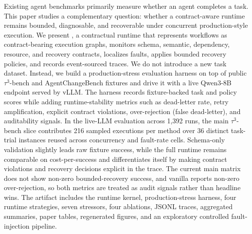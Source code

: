 Existing agent benchmarks primarily measure whether an agent completes a task. This paper studies a complementary question: whether a contract-aware runtime remains bounded, diagnosable, and recoverable under concurrent production-style execution. We present \system, a contractual runtime that represents workflows as contract-bearing execution graphs, monitors schema, semantic, dependency, resource, and recovery contracts, localizes faults, applies bounded recovery policies, and records event-sourced traces. We do not introduce a new task dataset. Instead, we build a production-stress evaluation harness on top of public \mbox{$\tau^3$}-bench and AgentChangeBench fixtures and drive it with a live Qwen3-8B endpoint served by vLLM. The harness records fixture-backed task and policy scores while adding runtime-stability metrics such as dead-letter rate, retry amplification, explicit contract violations, over-rejection (false dead-letter), and auditability signals. In the live-LLM evaluation across 1{,}392 runs, the main \mbox{$\tau^3$}-bench slice contributes 216 sampled executions per method over 36 distinct task-trial instances reused across concurrency and fault-rate cells. Schema-only validation slightly leads raw fixture success, while the full runtime remains comparable on cost-per-success and differentiates itself by making contract violations and recovery decisions explicit in the trace. The current main matrix does not show non-zero bounded-recovery success, and vanilla reports non-zero over-rejection, so both metrics are treated as audit signals rather than headline wins. The artifact includes the runtime kernel, production-stress harness, four runtime strategies, seven stressors, four ablations, JSONL traces, aggregated summaries, paper tables, regenerated figures, and an exploratory controlled fault-injection pipeline.
